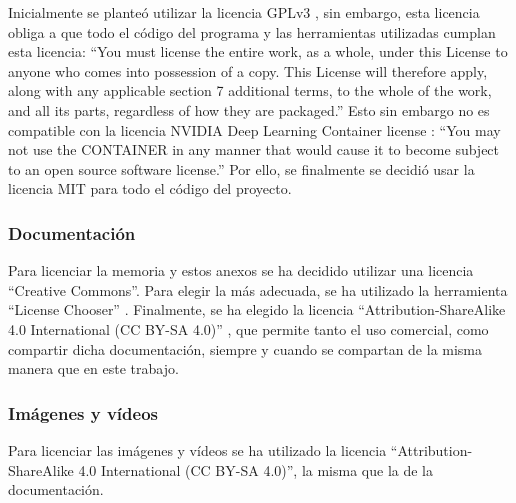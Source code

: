 Inicialmente se planteó utilizar la licencia GPLv3 \cite{gplv3}, sin embargo, esta licencia 
obliga a que todo el código del programa y las herramientas utilizadas cumplan esta licencia: 
``You must license the entire work, as a whole, under this License to anyone who comes into 
possession of a copy. This License will therefore apply, along with any applicable section 
7 additional terms, to the whole of the work, and all its parts, regardless of how they are 
packaged.'' Esto sin embargo no es compatible con la licencia NVIDIA Deep Learning Container license
\cite{nvidia_dl_container_license}: ``You may not use the CONTAINER in any manner that would cause it
to become subject to an open source software license.'' Por ello, se finalmente se decidió 
usar la licencia MIT \cite{mit_license} para todo el código del proyecto.

\subsubsection{Documentación}

Para licenciar la memoria y estos anexos se ha decidido utilizar una licencia ``Creative Commons''.
Para elegir la más adecuada, se ha utilizado la herramienta ``License Chooser'' \cite{creativecommons_chooser}.
Finalmente, se ha elegido la licencia ``Attribution-ShareAlike 4.0 International (CC BY-SA 4.0)'' \cite{cc_by_sa_license}, que permite 
tanto el uso comercial, como compartir dicha documentación, siempre y cuando se compartan de la misma manera que 
en este trabajo.

\subsubsection{Imágenes y vídeos}

Para licenciar las imágenes y vídeos se ha utilizado la licencia ``Attribution-ShareAlike 4.0 International (CC BY-SA 4.0)'', 
la misma que la de la documentación.